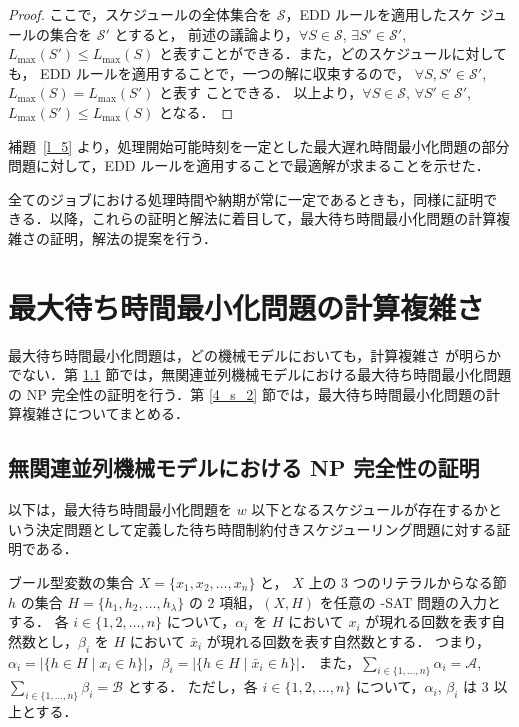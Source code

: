 \documentclass[12pt]{optlab-bachelor}
\begin{document}
\begin{proof}
  ここで，スケジュールの全体集合を $\mathcal{S}$，EDD ルールを適用したスケ
  ジュールの集合を $\mathcal{S}'$ とすると，
  前述の議論より，$\forall S \in \mathcal{S}$, $\exists S' \in \mathcal{S}'$, $L_{\max}(S') \le L_{\max}(S)$ と表すことができる．また，どのスケジュールに対しても，
  EDD ルールを適用することで，一つの解に収束するので，
  $\forall S, S' \in \mathcal{S}'$, $L_{\max}(S) = L_{\max}(S')$ と表す
  ことできる．
  以上より，$\forall S \in \mathcal{S}$, $\forall
  S' \in \mathcal{S}'$, $L_{\max}(S') \le L_{\max}(S)$ となる．
\end{proof}

補題~\ref{l_5} より，処理開始可能時刻を一定とした最大遅れ時間最小化問題の部分問題に対して，EDD ルールを適用することで最適解が求まることを示せた．

全てのジョブにおける処理時間や納期が常に一定であるときも，同様に証明で
きる．以降，これらの証明と解法に着目して，最大待ち時間最小化問題の計算複雑さの証明，解法の提案を行う．

\chapter{最大待ち時間最小化問題の計算複雑さ}\label{c_4}
最大待ち時間最小化問題は，どの機械モデルにおいても，計算複雑さ
が明らかでない．第 \ref{4_s_1} 節では，無関連並列機械モデルにおける最大待ち時間最小化問題の NP 完全性の証明を行う．第 \ref{4_s_2} 節では，最大待ち時間最小化問題の計算複雑さについてまとめる．

\section{無関連並列機械モデルにおける NP 完全性の証明}\label{4_s_1}
以下は，最大待ち時間最小化問題を $w$ 以下となるスケジュールが存在するかという決定問題として定義した待ち時間制約付きスケジューリング問題に対する証明である．

ブール型変数の集合 $X =\{x_1, x_2,\ldots ,x_n\}$ と， $X$ 上の 3 つのリテラルからなる節 $h$ の集合 $H =\{h_1, h_2,\ldots ,h_{\lambda}\}$ の 2 項組，$(X,H)$ を任意の {-SAT} 問題の入力とする．
各 $i \in \{1,2,\ldots, n\}$ について，$\alpha_i$ を $H$ において $x_i$ が現れる回数を表す自然数とし，$\beta_i$ を $H$ において $\bar x_i$ が現れる回数を表す自然数とする．
つまり，$\alpha_i = \big|\{h \in H \mid x_i \in h\}\big|$，$\beta_i = \big|\{h \in H \mid \bar x_i \in h\}\big|$．
また，$\displaystyle \sum_{i \in \{1,\ldots,n\}} \alpha_i = \mathcal{A}$, $\displaystyle \sum_{i \in \{1,\ldots,n\}} \beta_i = \mathcal{B}$  とする．
ただし，各 $i \in \{1,2,\ldots, n\}$ について，$\alpha_i$, $\beta_i$ は 3 以上とする．
\end{document}
